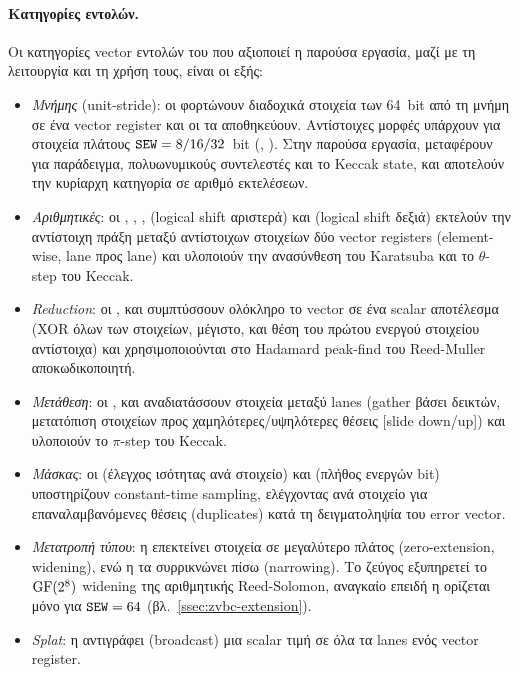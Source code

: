 \paragraph{Κατηγορίες εντολών.}
Οι κατηγορίες vector εντολών του \RVV που αξιοποιεί η παρούσα εργασία, μαζί
με τη λειτουργία και τη χρήση τους, είναι οι εξής:
\begin{itemize}
  \item \emph{Μνήμης} (unit-stride): οι  φορτώνουν διαδοχικά
    στοιχεία των 64~bit από τη μνήμη σε ένα vector register και οι
     τα αποθηκεύουν. Αντίστοιχες μορφές υπάρχουν για στοιχεία
    πλάτους $\texttt{SEW} = 8/16/32$~bit (, ).
    Στην παρούσα εργασία, μεταφέρουν για παράδειγμα, πολυωνυμικούς συντελεστές και το Keccak
    state, και αποτελούν την κυρίαρχη κατηγορία σε αριθμό εκτελέσεων.
  \item \emph{Αριθμητικές}: οι , , ,
     (logical shift αριστερά) και  (logical shift
    δεξιά) εκτελούν την αντίστοιχη πράξη μεταξύ αντίστοιχων στοιχείων δύο
    vector registers (element-wise, lane προς lane) και υλοποιούν την
    ανασύνθεση του Karatsuba και το $\theta$-step του Keccak.
  \item \emph{Reduction}: οι ,  και
     συμπτύσσουν ολόκληρο το vector σε ένα scalar αποτέλεσμα
    (XOR όλων των στοιχείων, μέγιστο, και θέση του πρώτου ενεργού στοιχείου
    αντίστοιχα) και χρησιμοποιούνται στο Hadamard peak-find του Reed-Muller
    αποκωδικοποιητή.
  \item \emph{Μετάθεση}: οι ,  και
     αναδιατάσσουν στοιχεία μεταξύ lanes (gather βάσει
    δεικτών, μετατόπιση στοιχείων προς χαμηλότερες/υψηλότερες θέσεις [slide
    down/up]) και υλοποιούν το $\pi$-step του
    Keccak.
  \item \emph{Μάσκας}: οι  (έλεγχος ισότητας ανά στοιχείο) και
     (πλήθος ενεργών bit) υποστηρίζουν constant-time sampling,
    ελέγχοντας ανά στοιχείο για επαναλαμβανόμενες θέσεις (duplicates) κατά τη
    δειγματοληψία του error vector.
  \item \emph{Μετατροπή τύπου}: η  επεκτείνει στοιχεία σε
    μεγαλύτερο πλάτος (zero-extension, widening), ενώ η  τα
    συρρικνώνει πίσω (narrowing). Το ζεύγος εξυπηρετεί το $\mathrm{GF}(2^8)$ widening
    της αριθμητικής Reed-Solomon, αναγκαίο επειδή η \vclmul ορίζεται μόνο
    για $\texttt{SEW} = 64$ (βλ.~\cref{ssec:zvbc-extension}).
  \item \emph{Splat}: η  αντιγράφει (broadcast) μια scalar
    τιμή σε όλα τα lanes ενός vector register.
\end{itemize}

